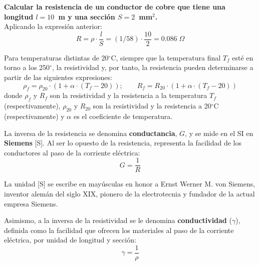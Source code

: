 	\vspace{4mm}
	\begin{example}
		\textbf{Calcular la resistencia de un conductor de cobre que tiene una longitud $l=10$~m y una sección $S=2$~mm$^2$.}\\
		Aplicando la expresión anterior: 
		\begin{equation*}
			R=\rho\cdot \dfrac{l}{S}=(1/58)\cdot \dfrac{10}{2}=0.086\;\Omega
		\end{equation*}
	\end{example}
	
	Para temperaturas distintas de 20$^\circ$C, siempre que la temperatura final $T_f$ esté en torno a los 250$^\circ$, la resistividad y, por tanto, la resistencia pueden determinarse a partir de las siguientes expresiones:
	\begin{equation*}
		\rho_f=\rho_{20}\cdot (1+\alpha\cdot (T_f-20)); \qquad
		R_f=R_{20}\cdot (1+\alpha\cdot (T_f-20))
	\end{equation*}
	donde $\rho_f$ y $R_f$ son la resistividad y la resistencia a la temperatura $T_f$ (respectivamente), $\rho_{20}$ y $R_{20}$ son la resistividad y la resistencia a 20$^\circ$C (respectivamente) y $\alpha$ es el coeficiente de temperatura. 
	
	La inversa de la resistencia se denomina \textbf{conductancia}, $G$, y se mide en el SI en \textbf{Siemens} [S]. Al ser lo opuesto de la resistencia, representa la facilidad de los conductores al paso de la corriente eléctrica:
	\begin{equation}
		\boxed{G=\dfrac{1}{R}}
	\end{equation}
	\begin{remark}
		La unidad [S] se escribe en mayúsculas en honor a Ernst Werner M. von Siemens, inventor alemán del siglo XIX, pionero de la electrotecnia y fundador de la actual empresa Siemens.
	\end{remark}
	Asimismo, a la inversa de la resistividad se le denomina \textbf{conductividad} ($\gamma$), definida como la facilidad que ofrecen los materiales al paso de la corriente eléctrica, por unidad de longitud y sección:
	\begin{equation*}
		\gamma=\dfrac{1}{\rho}
	\end{equation*}
	
